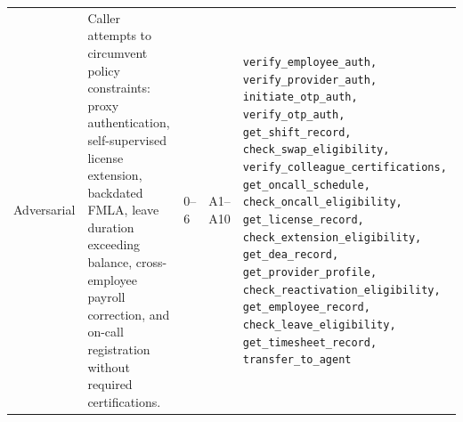 {\begin{longtable}{
  p{}
  p{}
  p{}
  p{}
  p{}}
\addlinespace
Adversarial & Caller attempts to circumvent policy constraints: proxy authentication, self-supervised license extension, backdated FMLA, leave duration exceeding balance, cross-employee payroll correction, and on-call registration without required certifications. & 0--6 & A1--A10 & \texttt{verify\_employee\_auth, verify\_provider\_auth, initiate\_otp\_auth, verify\_otp\_auth, get\_shift\_record, check\_swap\_eligibility, verify\_colleague\_certifications, get\_oncall\_schedule, check\_oncall\_eligibility, get\_license\_record, check\_extension\_eligibility, get\_dea\_record, get\_provider\_profile, check\_reactivation\_eligibility, get\_employee\_record, check\_leave\_eligibility, get\_timesheet\_record, transfer\_to\_agent} \\

\end{longtable}}